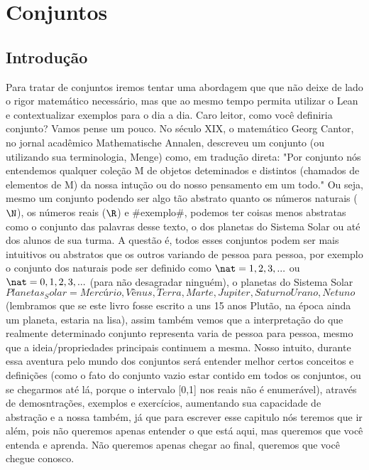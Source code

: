 \chapter{Conjuntos}

\section{Introdução}

    Para tratar de conjuntos iremos tentar uma abordagem que que não deixe de lado o rigor matemático necessário, mas que ao mesmo tempo permita utilizar o Lean e contextualizar exemplos para o dia a dia. 
    Caro leitor, como você definiria conjunto? Vamos pense um pouco. No século XIX, o matemático Georg Cantor, no jornal acadêmico Mathematische Annalen, descreveu um conjunto (ou utilizando sua terminologia, Menge) como, em tradução direta: "Por conjunto nós entendemos qualquer coleção M de objetos deteminados e distintos (chamados de elementos de M) da nossa intução ou do nosso pensamento em um todo."
    Ou seja, mesmo um conjunto podendo ser algo tão abstrato quanto os números naturais ($\N$), os números reais ($\R$) e #exemplo#, podemos ter coisas menos abstratas como o conjunto das palavras desse texto, o dos planetas do Sistema Solar ou até dos alunos de sua turma. A questão é, todos esses conjuntos podem ser mais intuitivos ou abstratos que os outros variando de pessoa para pessoa, por exemplo o conjunto dos naturais pode ser definido como $\nat = {1,2,3,...}$ ou $\nat={0,1,2,3,...}$ (para não desagradar ninguém), o planetas do Sistema Solar $Planetas_Solar={Mercúrio, Vênus, Terra,Marte, Jupiter, Saturno Urano, Netuno}$ (lembramos que se este livro fosse escrito a uns 15 anos Plutão, na época ainda um planeta, estaria na lisa), assim também vemos que a interpretação do que realmente determinado conjunto representa varia de pessoa para pessoa, mesmo que a ideia/propriedades principais continuem a mesma.
    Nosso intuito, durante essa aventura pelo mundo dos conjuntos será entender melhor certos conceitos e definições (como o fato do conjunto vazio estar contido em todos os conjuntos, ou se chegarmos até lá, porque o intervalo [0,1] nos reais não é enumerável), através de demosntrações, exemplos e exercícios, aumentando sua capacidade de abstração e a nossa também, já que para escrever esse capitulo nós teremos que ir além, pois não queremos apenas entender o que está aqui, mas queremos que você entenda e aprenda. Não queremos apenas chegar ao final, queremos que você chegue conosco.

